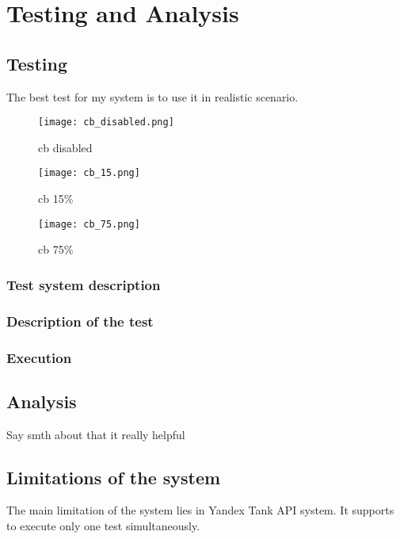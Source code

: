 \chapter{Testing and Analysis}
\label{ch:testing}


\section{Testing}
The best test for my system is to use it in realistic scenario.


\begin{figure}[t]
    \centering
    \texttt{[image: cb\_disabled.png]}
    \caption{cb disabled}
    \label{fig:cb_disabled}
\end{figure}

\begin{figure}[t]
    \centering
    \texttt{[image: cb\_15.png]}
    \caption{cb 15\%}
    \label{fig:cb_15\%}
\end{figure}

\begin{figure}[t]
    \centering
    \texttt{[image: cb\_75.png]}
    \caption{cb 75\%}
    \label{fig:cb_75\%}
\end{figure}

\subsection{Test system description}\label{subsec:test_system_description}

\subsection{Description of the test}\label{subsec:test_description}

\subsection{Execution}\label{subsec:test_description}

\section{Analysis}
Say smth about that it really helpful

\section{Limitations of the system}
The main limitation of the system lies in Yandex Tank API system. It supports to execute only one test simultaneously.